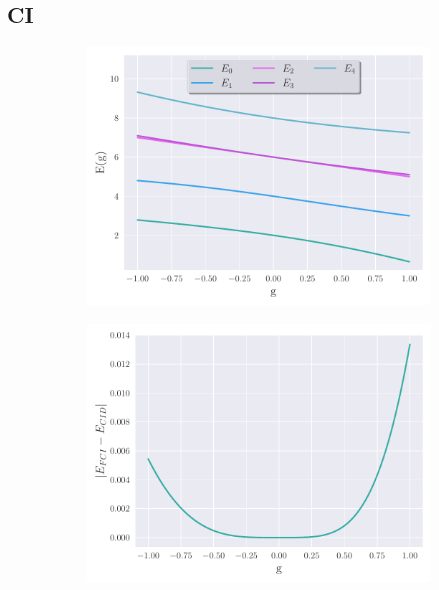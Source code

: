 \documentclass[
11pt,notheorems,hyperref={pdfauthor=whatever}
]{beamer}
\begin{document}
\subsection{CI}
\begin{frame}
    \begin{figure}
        \begin{subfigure}{.49\textwidth}
            \includegraphics[width=\linewidth]{figs/CID.pdf}
        \end{subfigure}
        \hfill
        \begin{subfigure}{.49\textwidth}
            \centering
            \includegraphics[width=\linewidth]{figs/FCI_CID_diff.pdf}
        \end{subfigure}
    \end{figure}
\end{frame}
\end{document}
